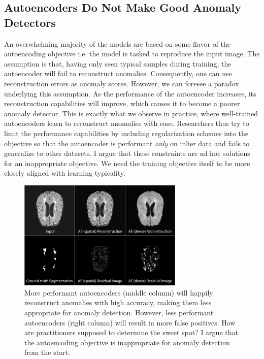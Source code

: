 \subsection*{Autoencoders Do Not Make Good Anomaly Detectors}
An overwhelming majority of the models are based on some flavor of the autoencoding objective \cite{baur_deep_2019,baur2021,tschuchnig_anomaly_2022,kascenasRoleNoiseDenoising2023} i.e. the model is tasked to reproduce the input image. The assumption is that, having only seen typical samples during training, the autoencoder will fail to reconstruct anomalies. Consequently, one can use reconstruction errors as anomaly scores. However, we can foresee a paradox underlying this assumption. As the performance of the autoencoder increases, its reconstruction capabilities will improve, which causes it to become a poorer anomaly detector. This is exactly what we observe in practice, where well-trained autoencoders learn to reconstruct anomalies with ease. Researchers thus try to limit the performance capabilities by including regularization schemes into the objective so that the autoencoder is performant \textit{only} on inlier data and fails to generalize to other datasets. I argue that these constraints are ad-hoc solutions for an inappropriate objective. We need the training objective itself to be more closely aligned with learning typicality. 

\begin{figure}[tbhp]
\centering
    \centering
    \includegraphics[width=0.7\textwidth]{figures/ae_failure.jpg}
    \caption{More performant autoencoders (middle column) will happily reconstruct anomalies with high accuracy, making them less appropriate for anomaly detection. However, less performant autoencoders (right column) will result in more false positives. How are practitioners supposed to determine the sweet spot? I argue that the autoencoding objective is inappropriate for anomaly detection from the start.}
    \label{fig:ae_failure}
\end{figure}%


